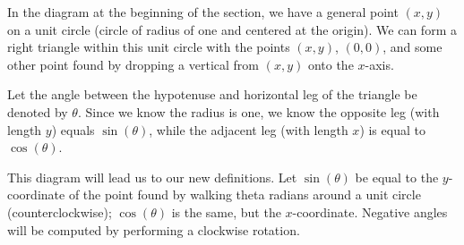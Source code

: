 \documentclass[../book.tex]{subfiles}
\begin{document}
In the diagram at the beginning of the section, we have a general point $(x,y)$ on a unit circle (circle of radius of one and centered at the origin). We can form a right triangle within this unit circle with the points $(x,y)$, $(0,0)$, and some other point found by dropping a vertical from $(x,y)$ onto the $x$-axis.

Let the angle between the hypotenuse and horizontal leg of the triangle be denoted by $\theta$. Since we know the radius is one, we know the opposite leg (with length $y$) equals $\sin(\theta)$, while the adjacent leg (with length $x$) is equal to $\cos(\theta)$.

This diagram will lead us to our new definitions. Let $\sin(\theta)$ be equal to the $y$-coordinate of the point found by walking theta radians around a unit circle (counterclockwise); $\cos(\theta)$ is the same, but the $x$-coordinate. Negative angles will be computed by performing a clockwise rotation.
\end{document}
